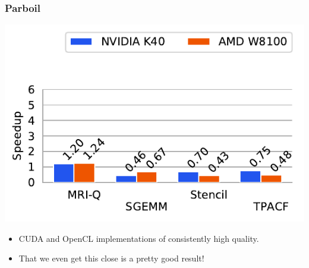 \documentclass[rgb,dvipsnames]{beamer}
\begin{document}
\begin{frame}
  \frametitle{Parboil}

  \begin{center}
    \includegraphics[scale=0.8]{img/parboil.pdf}
  \end{center}


  \begin{itemize}
  \item CUDA and OpenCL implementations of consistently high quality.
  \item That we even get this close is a pretty good result!
  \end{itemize}

\end{frame}

\newcommand{\SGg}{\cellcolor{blue!40}}
\newcommand{\SGgt}{\cellcolor{blue!20}}
\newcommand{\SGt}{\cellcolor{green!30}}
\newcommand{\SGthI}{\cellcolor{blue!65}}
\newcommand{\SGthII}{\cellcolor{blue!75}}
\newcommand{\SGthIII}{\cellcolor{blue!95}}
\end{document}

